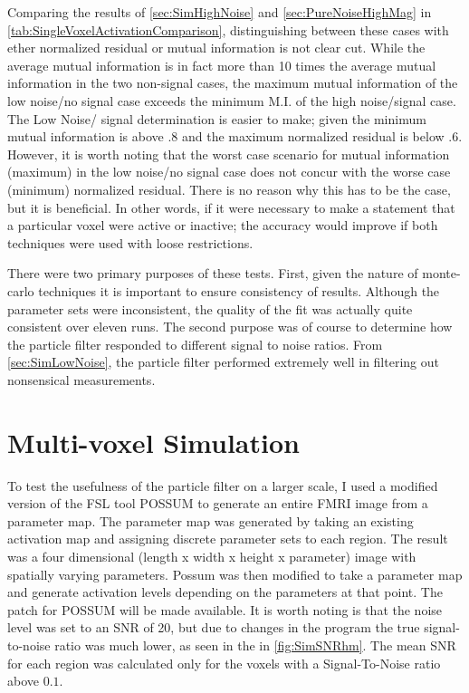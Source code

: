 Comparing the results of \autoref{sec:SimHighNoise} and \autoref{sec:PureNoiseHighMag} 
in \autoref{tab:SingleVoxelActivationComparison}, 
distinguishing between these cases with ether normalized residual or mutual information
is not clear cut. While the average mutual information is in fact more than 10 times
the average mutual information in the two non-signal cases, the maximum
mutual information of the low noise/no signal case exceeds the minimum M.I. of the high noise/signal
case. The Low Noise/ signal determination is easier to make; given
the minimum mutual information is above $.8$ and the maximum normalized residual is below $.6$.
However, it is worth noting that the worst case scenario  for mutual information (maximum) in the
low noise/no signal case does not concur with the worse case (minimum) normalized residual. 
There is no reason why this has to be the case, but it is beneficial. In
other words, if it were necessary to make a statement that
a particular voxel were active or inactive; the accuracy would improve if both techniques
were used with loose restrictions.

There were two primary purposes of these tests. First, given the nature of monte-carlo
techniques it is important to ensure consistency of results. Although the parameter
sets were inconsistent, the quality of the fit was actually quite consistent
over eleven runs. The second purpose was of course to determine how the particle 
filter responded to different signal to noise ratios. From \autoref{sec:SimLowNoise},
the particle filter performed extremely well in filtering out nonsensical measurements.

\section{Multi-voxel Simulation}
\label{sec:Multi-voxel Simulation}
To test the usefulness of the particle filter on a larger scale, I used a modified version 
of the FSL tool 
POSSUM to generate an entire FMRI image from a parameter map. The parameter map was generated
by taking an existing activation map and assigning discrete parameter sets to each region.
The result was a four dimensional (length x width
x height x parameter) image with spatially varying parameters. Possum was then modified
to take a parameter map and generate activation levels depending on the parameters at that
point. The patch for POSSUM will be made available. It is worth noting is that the noise 
level was set to an SNR of 20, but due to changes 
in the program the true signal-to-noise ratio was much lower, as seen in the 
in \autoref{fig:SimSNRhm}. The mean SNR for each region was calculated only for the
voxels with a Signal-To-Noise ratio above $0.1$.

